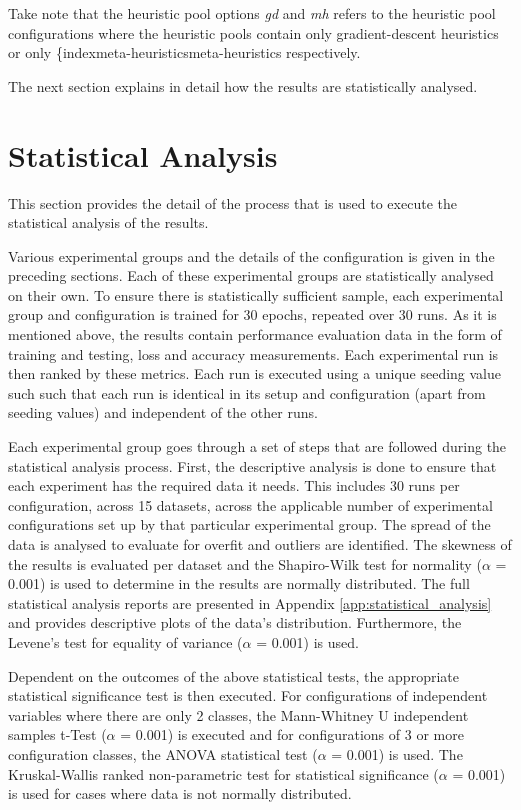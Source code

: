 Take note that the heuristic pool options \textit{gd} and \textit{mh} refers to the heuristic pool configurations where the heuristic pools contain only gradient-descent heuristics or only \{index{meta-heuristics}meta-heuristics  respectively.

The next section explains in detail how the results are statistically analysed.

\section{Statistical Analysis}
\label{sec:methodology:statistical_analysis}

This section provides the detail of the process that is used to execute the statistical analysis of the results.

Various experimental groups and the details of the configuration is given in the preceding sections. Each of these experimental groups are statistically analysed on their own. To ensure there is statistically sufficient sample, each experimental group and configuration is trained for 30 epochs, repeated over 30 runs. As it is mentioned above, the results contain performance evaluation data in the form of training and testing, loss and accuracy measurements. Each experimental run is then ranked by these metrics. Each run is executed using a unique seeding value such such that each run is identical in its setup and configuration (apart from seeding values) and independent of the other runs.

Each experimental group goes through a set of steps that are followed during the statistical analysis process. First, the descriptive analysis is done to ensure that each experiment has the required data it needs. This includes 30 runs per configuration, across 15 datasets, across the applicable number of experimental configurations set up by that particular experimental group. The spread of the data is analysed to evaluate for overfit and outliers are identified. The skewness of the results is evaluated per dataset and the Shapiro-Wilk test for normality ($\alpha$ = 0.001) is used to determine in the results are normally distributed. The full statistical analysis reports are presented in Appendix \ref{app:statistical_analysis} and provides descriptive plots of the data's distribution. Furthermore, the Levene's test for equality of variance ($\alpha$ = 0.001) is used.

Dependent on the outcomes of the above statistical tests, the appropriate statistical significance test is then executed. For configurations of independent variables where there are only 2 classes, the Mann-Whitney U independent samples t-Test ($\alpha$ = 0.001) is executed and for configurations of 3 or more configuration classes, the \ac{ANOVA} statistical test ($\alpha$ = 0.001) is used. The Kruskal-Wallis ranked non-parametric test for statistical significance ($\alpha$ = 0.001) is used for cases where data is not normally distributed.

